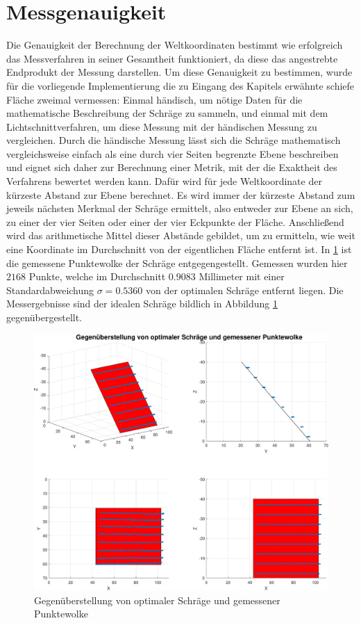 \section{Messgenauigkeit}
Die Genauigkeit der Berechnung der Weltkoordinaten bestimmt wie erfolgreich das Messverfahren in seiner Gesamtheit funktioniert, da diese das angestrebte Endprodukt der Messung darstellen. Um diese Genauigkeit zu bestimmen, wurde für die vorliegende Implementierung die zu Eingang des Kapitels erwähnte schiefe Fläche zweimal vermessen: Einmal händisch, um nötige Daten für die mathematische Beschreibung der Schräge zu sammeln, und einmal mit dem Lichtschnittverfahren, um diese Messung mit der händischen Messung zu vergleichen. Durch die händische Messung lässt sich die Schräge mathematisch vergleichsweise einfach als eine durch vier Seiten begrenzte Ebene beschreiben und eignet sich daher zur Berechnung einer Metrik, mit der die Exaktheit des Verfahrens bewertet werden kann. Dafür wird für jede Weltkoordinate der kürzeste Abstand zur Ebene berechnet. Es wird immer der kürzeste Abstand zum jeweils nächsten Merkmal der Schräge ermittelt, also entweder zur Ebene an sich, zu einer der vier Seiten oder einer der vier Eckpunkte der Fläche. Anschließend wird das arithmetische Mittel dieser Abstände gebildet, um zu ermitteln, wie weit eine Koordinate im Durchschnitt von der eigentlichen Fläche entfernt ist. \linebreak
In \ref{fig:MessungSlope} ist die gemessene Punktewolke der Schräge entgegengestellt. Gemessen wurden hier \(2168\) Punkte, welche im Durchschnitt \(0.9083\) Millimeter mit einer Standardabweichung \(\sigma = 0.5360\) von  der optimalen Schräge entfernt liegen. Die Messergebnisse sind der idealen Schräge bildlich in Abbildung \ref{fig:MessungSlope} gegenübergestellt. \bigbreak

\begin{figure}
\centering \includegraphics[width=\textwidth]{images/MessungBig.pdf}
\caption[Gegenüberstellung von optimaler Schräge und gemessener Punktewolke]{Gegenüberstellung von optimaler Schräge und gemessener Punktewolke}\label{fig:MessungSlope}
\end{figure}

